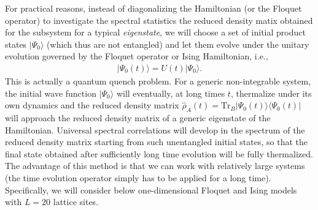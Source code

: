 \documentclass[aps,prb,preprint,onecolumn,amsmath,amssymb,superscriptaddress,eqsecnum,floatfix,scrartcl]{revtex4-1}
\begin{document}
For practical reasons,
 instead of diagonalizing the Hamiltonian (or the Floquet operator) to
investigate the 
 spectral statistics
the reduced density matix obtained for the subsystem for a typical {\it eigenstate}\cite{footnote_1},
we will choose 
a set of
initial product states $|\Psi_0\rangle$
(which thus are not entangled)
and let them evolve under the unitary evolution governed by  the Floquet operator or Ising Hamiltonian, i.e., 
\begin{eqnarray}
\label{TimeEvolvedInitialState}
|\Psi_0(t)\rangle=U(t)|\Psi_0\rangle.
\end{eqnarray}
 This is actually  a quantum quench problem.  For a generic non-integrable system,
the initial wave function $|\Psi_0\rangle$
will eventually, at long times $t$,  thermalize under 
its  own dynamics and 
the reduced density matrix ${\hat \rho}_A(t)=\mbox{Tr}_B|\Psi_0(t)\rangle\langle\Psi_0(t)|$ will
approach the reduced
density matrix of  a generic eigenstate of the Hamiltonian.\cite{Srednicki1994,Deutsch1991}
Universal spectral correlations
 will develop in the spectrum of the  reduced density matrix starting from 
such
unentangled  initial states, so that the final state obtained
 after sufficiently  long 
time evolution will be fully thermalized. The advantage of this method is that we can work with relatively
large  systems (the time evolution operator simply has to be applied for a long time).
Specifically,  we will consider below
one-dimensional Floquet and Ising models with  $L=20$ lattice sites.
\end{document}
